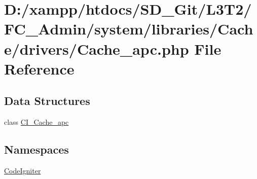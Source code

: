 \hypertarget{_admin_2system_2libraries_2_cache_2drivers_2_cache__apc_8php}{}\section{D\+:/xampp/htdocs/\+S\+D\+\_\+\+Git/\+L3\+T2/\+F\+C\+\_\+\+Admin/system/libraries/\+Cache/drivers/\+Cache\+\_\+apc.php File Reference}
\label{_admin_2system_2libraries_2_cache_2drivers_2_cache__apc_8php}
\subsection*{Data Structures}
\begin{DoxyCompactItemize}
\item 
class \hyperlink{class_c_i___cache__apc}{C\+I\+\_\+\+Cache\+\_\+apc}
\end{DoxyCompactItemize}
\subsection*{Namespaces}
\begin{DoxyCompactItemize}
\item 
 \hyperlink{namespace_code_igniter}{Code\+Igniter}
\end{DoxyCompactItemize}
